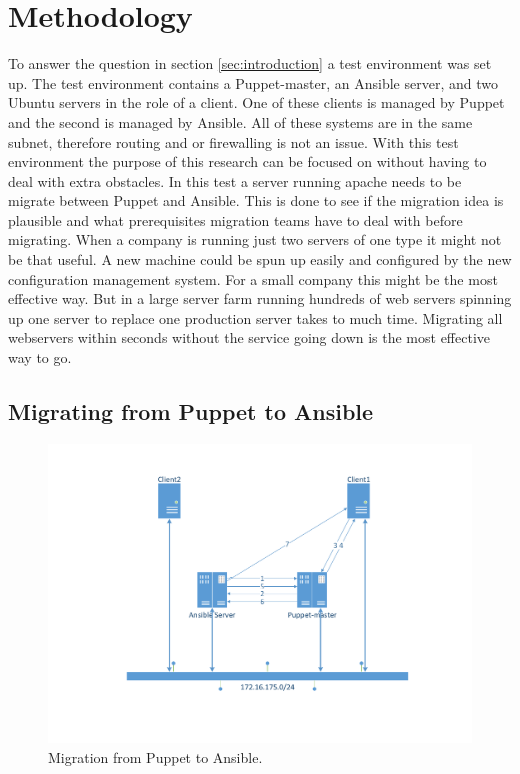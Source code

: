 \section{Methodology}\label{sec:methodology}

To answer the question in section \ref{sec:introduction} a test environment was set up. The test environment contains a Puppet-master, an Ansible server, and two Ubuntu servers in the role of a  client. One of these clients is managed by Puppet and the second is managed by Ansible. All of these systems are in the same subnet, therefore routing and or firewalling is not an issue. With this test environment the purpose of this research can be focused on without having to deal with extra obstacles.  
In this test a server running apache needs to be  migrate between Puppet and Ansible. This is done to see if the migration idea is plausible and what prerequisites migration teams have to deal with before migrating. When a company is running just two servers of one type it might not be that useful. A new machine could be spun up easily and configured by the new configuration management system. For a small company this might be the most effective way. But in a large server farm running hundreds of web servers spinning up one server to replace one production server takes to much time. Migrating all webservers within seconds without the service going down is the most effective way to go.  

\subsection{Migrating from Puppet to Ansible}\label{subsec:puppettoansible}

\begin{figure}[!hb]
        \includegraphics[scale=0.5]{img/PuppettoAnsible.pdf}
        \caption{Migration from Puppet to Ansible.}
        \label{fig:situation1}
\end{figure}


